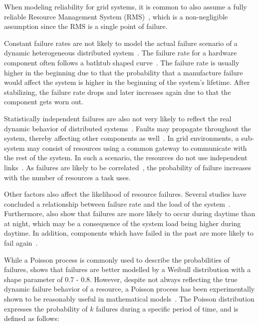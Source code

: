 \documentclass{cslthse-msc}
\begin{document}
When modeling reliability for grid systems, it is common to also assume a fully reliable Resource Management System (RMS)~\cite{relAndPerfGridServices, relGridServicePredConstraint}, which is a non-negligible assumption since the RMS is a single point of failure.

Constant failure rates are not likely to model the actual failure scenario of a dynamic heterogeneous distributed system~\cite{algoMinExTime}. The failure rate for a hardware component often follows a bathtub shaped curve~\cite{surveyReliabilityDistr}. The failure rate is usually higher in the beginning due to that the probability that a manufacture failure would affect the system is higher in the beginning of the system's lifetime. After stabilizing, the failure rate drops and later increases again due to that the component gets worn out.

Statistically independent failures are also not very likely to reflect the real dynamic behavior of distributed systems~\cite{surveyReliabilityDistr, cloudServiceRel}. Faults may propagate throughout the system, thereby affecting other components as well~\cite{relGridSystems}. In grid environments, a sub-system may consist of resources using a common gateway to communicate with the rest of the system. In such a scenario, the resources do not use independent links~\cite{optResourceAllMaxPerformance}. As failures are likely to be correlated~\cite{perfImplPerCheckPoint}, the probability of failure increases with the number of resources a task uses.

Other factors also affect the likelihood of resource failures. Several studies have concluded a relationship between failure rate and the load of the system~\cite{studyOfFailures, implicationsOfFailures}. Furthermore, \cite{studyOfFailures, implicationsOfFailures} also show that failures are more likely to occur during daytime than at night, which may be a consequence of the system load being higher during daytime. In addition, components which have failed in the past are more likely to fail again~\cite{implicationsOfFailures}.

While a Poisson process is commonly used to describe the probabilities of failures, \cite{studyOfFailures} shows that failures are better modelled by a Weibull distribution with a shape parameter of 0.7 - 0.8. However, despite not always reflecting the true dynamic failure behavior of a resource, a Poisson process has been experimentally shown to be reasonably useful in mathematical models~\cite{experimentalFailureAssessment}. The Poisson distribution expresses the probability of $k$ failures during a specific period of time, and is defined as follows:
\end{document}
